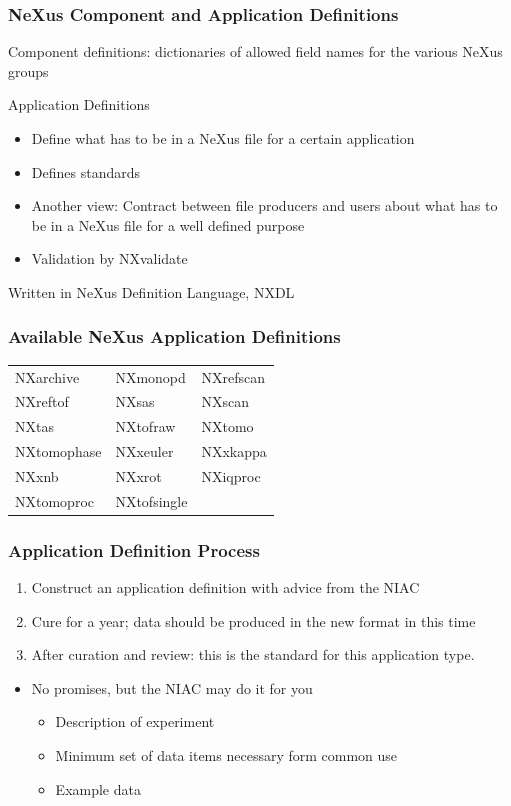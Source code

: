 \documentclass{beamer}
\newcommand{\changefont}[3] {
 \fontfamily{#1} \fontseries{#2} \fontshape{#3} \selectfont}
\begin{document}
\begin{frame} \frametitle{NeXus Component and Application Definitions }
\begin{itemize}
\item Component definitions: 
 dictionaries of allowed field names for the various NeXus groups
{\changefont{cmr}{bx}{sc} 
\item Application Definitions
\begin{itemize}
\item Define what has to be in a NeXus file for a certain application
\item Defines standards
\item Another view: Contract between file producers and users about what has to be in 
 a NeXus file for a well defined purpose 
\item Validation by NXvalidate
\end{itemize}
}
\item Written in NeXus Definition Language, NXDL
\end{itemize}
\end{frame}

\begin{frame} \frametitle{Available NeXus Application Definitions}
{\changefont{cmr}{bx}{sc} 
\begin{tabular}{lll}
NXarchive& NXmonopd & NXrefscan \\
NXreftof & NXsas & NXscan \\
NXtas & NXtofraw& NXtomo\\
NXtomophase & NXxeuler & NXxkappa\\
NXxnb & NXxrot & NXiqproc \\
NXtomoproc & NXtofsingle& \\
\end{tabular}
}
\end{frame}


\begin{frame} \frametitle{Application Definition Process}
\begin{enumerate}
\item Construct an application definition with advice from the NIAC
\item Cure for a year; data should be produced in the new format in this time
\item After curation and review: this is the standard for this application type.
\end{enumerate}
\begin{itemize}
\item No promises, but the NIAC may do it for you
\begin{itemize}
\item Description of experiment
\item Minimum set of data items necessary form common use
\item Example data
\end{itemize}
\end{itemize}

\end{frame}
\end{document}
